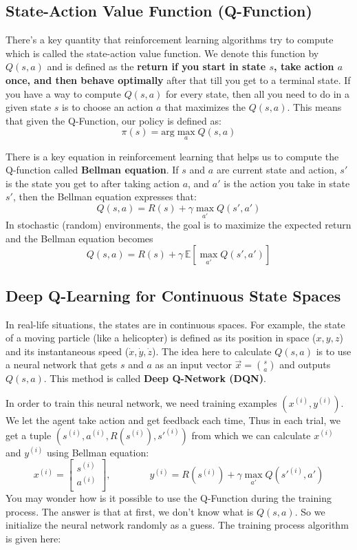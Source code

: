 \documentclass[a4paper, 12pt]{book}
\begin{document}
\subsection{State-Action Value Function (Q-Function)}

There's a key quantity that reinforcement learning algorithms try to compute which is called the state-action value function. We denote this function by $Q(s, a)$ and is defined as the \textbf{return if you start in state $s$, take action $a$ once, and then behave optimally} after that till you get to a terminal state. If you have a way to compute $Q(s, a)$ for every state, then all you need to do in a given state $s$ is to choose an action $a$ that maximizes the $Q(s, a)$. This means that given the Q-Function, our policy is defined as: \[\pi(s) = \text{arg}\max_a Q(s, a)\]

There is a key equation in reinforcement learning that helps us to compute the Q-function called \textbf{Bellman equation}. If $s$ and $a$ are current state and action, $s'$ is the state you get to after taking action $a$, and $a'$ is the action you take in state $s'$, then the Bellman equation expresses that: \[Q(s, a) = R(s) + \gamma \max_{a'} Q(s', a')\] In stochastic (random) environments, the goal is to maximize the expected return and the Bellman equation becomes \[Q(s, a) = R(s) + \gamma \, \mathbb{E}[\max_{a'} Q(s', a')]\]

\subsection{Deep Q-Learning for Continuous State Spaces}

In real-life situations, the states are in continuous spaces. For example, the state of a moving particle (like a helicopter) is defined as its position in space ($x, y, z$) and its instantaneous speed ($\Dot{x}, \Dot{y}, \Dot{z}$). The idea here to calculate $Q(s, a)$ is to use a neural network that gets $s$ and $a$ as an input vector $\Vec{x} = \binom{s}{a}$ and outputs $Q(s, a)$. This method is called \textbf{Deep Q-Network (DQN)}.

In order to train this neural network, we need training examples $(x^{(i)}, y^{(i)})$. We let the agent take action and get feedback each time, Thus in each trial, we get a tuple $(s^{(i)}, a^{(i)}, R(s^{(i)}), s'^{(i)})$ from which we can calculate $x^{(i)}$ and $y^{(i)}$ using Bellman equation:
\[x^{(i)} = \begin{bmatrix}
    s^{(i)} \\
    a^{(i)} \\
\end{bmatrix}, \qquad \qquad y^{(i)} = R(s^{(i)}) + \gamma \max_{a'} Q(s'^{(i)}, a')\]
You may wonder how is it possible to use the Q-Function during the training process. The answer is that at first, we don't know what is $Q(s, a)$. So we initialize the neural network randomly as a guess. The training process algorithm is given here:
\end{document}
